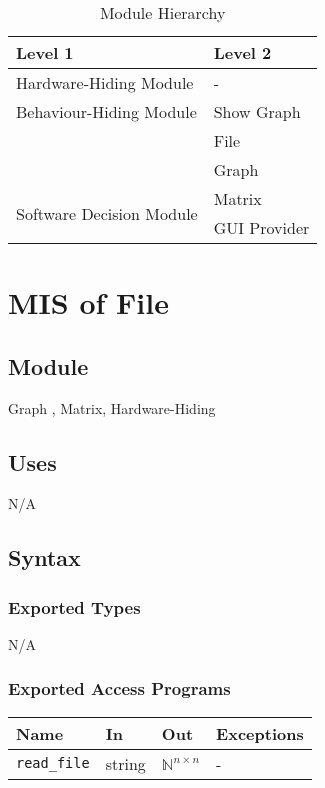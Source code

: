 \documentclass[12pt, titlepage]{article}
\begin{document}
\begin{table}[h!]
\centering
\begin{tabular}{p{} p{}}
\toprule
\textbf{Level 1} & \textbf{Level 2}\\
\midrule

{Hardware-Hiding Module} & - \\
\midrule

{Behaviour-Hiding Module} & Show Graph \\ & File\\ &Graph\\
\midrule

\multirow{3}{0.3\textwidth}{Software Decision Module} & Matrix\\ & GUI Provider\\
\bottomrule

\end{tabular}
\caption{Module Hierarchy}
\label{TblMH}
\end{table}

\newpage

\section{MIS of File } \label{Module} 


\subsection{Module}
Graph , Matrix, Hardware-Hiding

\subsection{Uses}
N/A
\subsection{Syntax}

\subsubsection{Exported Types}
N/A
\subsubsection{Exported Access Programs}

\begin{center}
\begin{tabular}{p{2cm} p{2cm} p{2cm} p{4cm}}
\hline
\textbf{Name} & \textbf{In} & \textbf{Out} & \textbf{Exceptions} \\
\hline
\texttt{read\_file} & string & ${\mathbb{N}}^ {n\times n}$ & - \\
\hline
\end{tabular}
\end{center}
\end{document}
